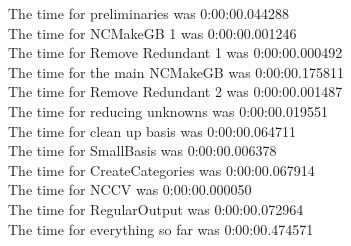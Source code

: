 \documentclass[rep10,leqno]{report}
\begin{document}
\noindent
The time for preliminaries was 0:00:00.044288\\
The time for NCMakeGB 1 was 0:00:00.001246\\
The time for Remove Redundant 1 was 0:00:00.000492\\
The time for the main NCMakeGB was 0:00:00.175811\\
The time for Remove Redundant 2 was 0:00:00.001487\\
The time for reducing unknowns was 0:00:00.019551\\
The time for clean up basis was 0:00:00.064711\\
The time for SmallBasis was 0:00:00.006378\\
The time for CreateCategories was 0:00:00.067914\\
The time for NCCV was 0:00:00.000050\\
The time for RegularOutput was 0:00:00.072964\\
The time for everything so far was 0:00:00.474571\\
\end{document}
